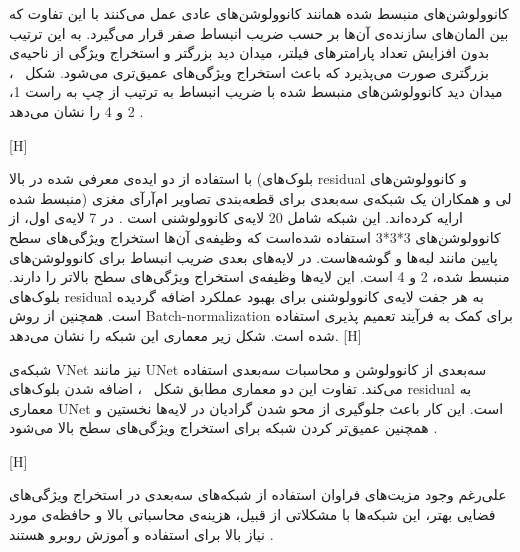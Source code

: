 کانوولوشن‌های منبسط شده همانند کانوولوشن‌های عادی عمل می‌کنند با این تفاوت که بین المان‌های سازنده‌ی آن‌ها بر حسب ضریب انبساط صفر قرار می‌گیرد. به این ترتیب بدون افزایش تعداد پارامتر‌های فیلتر، میدان دید بزرگتر و استخراج ویژگی از ناحیه‌‌ی بزرگتری صورت می‌پذیرد که باعث استخراج ویژگی‌های عمیق‌تری می‌شود. شکل ~، میدان دید کانوولوشن‌های منبسط شده با ضریب انبساط به ترتیب از چپ به راست 1، 2 و 4 را نشان می‌دهد .

[H]

با استفاده از دو ایده‌ی معرفی شده در بالا (بلوک‌های residual و کانوولوشن‌های منبسط شده) لی و همکاران یک شبکه‌ی سه‌بعدی برای قطعه‌بندی تصاویر ام‌آرآی مغزی ارایه کرده‌اند. این شبکه شامل 20 لایه‌ی کانوولوشنی است . در 7 لایه‌ی اول، از کانوولوشن‌های 3*3*3 استفاده شده‌‌است که وظیفه‌ی آن‌ها استخراج ویژگی‌های سطح پایین مانند لبه‌ها و گوشه‌هاست. در لایه‌های بعدی ضریب انبساط برای کانوولوشن‌های منبسط شده، 2 و 4 است. این لایه‌ها وظیفه‌ی استخراج ویژگی‌های سطح بالاتر را دارند. بلوک‌های residual به هر جفت لایه‌ی کانوولوشنی برای بهبود عملکرد اضافه گردیده است. همچنین از روش Batch-normalization برای کمک به فرآیند تعمیم پذیری استفاده شده است. شکل زیر معماری این شبکه را نشان می‌دهد.
[H]

شبکه‌ی VNet نیز مانند UNet سه‌بعدی از کانوولوشن و محاسبات سه‌بعدی استفاده می‌کند. تفاوت این دو معماری مطابق شکل ~، اضافه شدن بلوک‌های residual به معماری UNet است. این کار باعث جلوگیری از محو شدن گرادیان در لایه‌ها نخستین و همچنین عمیق‌تر کردن شبکه برای استخراج ویژگی‌های سطح بالا می‌شود .

[H]

علی‌رغم وجود مزیت‌های فراوان استفاده از شبکه‌های سه‌بعدی در استخراج ویژگی‌های فضایی بهتر، این شبکه‌ها با مشکلاتی از قبیل، هزینه‌ی محاسباتی بالا و حافظه‌ی مورد نیاز بالا برای استفاده و آموزش روبرو هستند . 

 


